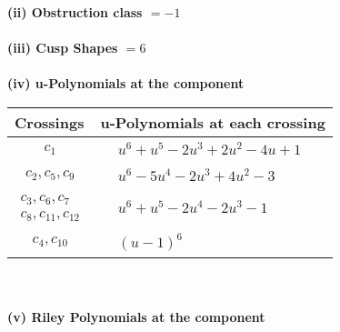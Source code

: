 \documentclass[1p]{elsarticle_modified}
\theoremstyle{definition}
\begin{document}
\flushleft \textbf{(ii) Obstruction class $= -1$}\\~\\
\flushleft \textbf{(iii) Cusp Shapes $= 6$}\\~\\
\newpage\renewcommand{\arraystretch}{1}
\flushleft \textbf{(iv) u-Polynomials at the component}\newline \\
\begin{tabular}{m{50pt}|m{274pt}}
Crossings & \hspace{64pt}u-Polynomials at each crossing \\
\hline $$\begin{aligned}c_{1}\end{aligned}$$&$\begin{aligned}
&u^6+u^5-2 u^3+2 u^2-4 u+1
\end{aligned}$\\
\hline $$\begin{aligned}c_{2},c_{5},c_{9}\end{aligned}$$&$\begin{aligned}
&u^6-5 u^4-2 u^3+4 u^2-3
\end{aligned}$\\
\hline $$\begin{aligned}c_{3},c_{6},c_{7}\\c_{8},c_{11},c_{12}\end{aligned}$$&$\begin{aligned}
&u^6+u^5-2 u^4-2 u^3-1
\end{aligned}$\\
\hline $$\begin{aligned}c_{4},c_{10}\end{aligned}$$&$\begin{aligned}
&(u-1)^6
\end{aligned}$\\
\hline
\end{tabular}\\~\\
\newpage\renewcommand{\arraystretch}{1}
\flushleft \textbf{(v) Riley Polynomials at the component}\newline \\
\end{document}
